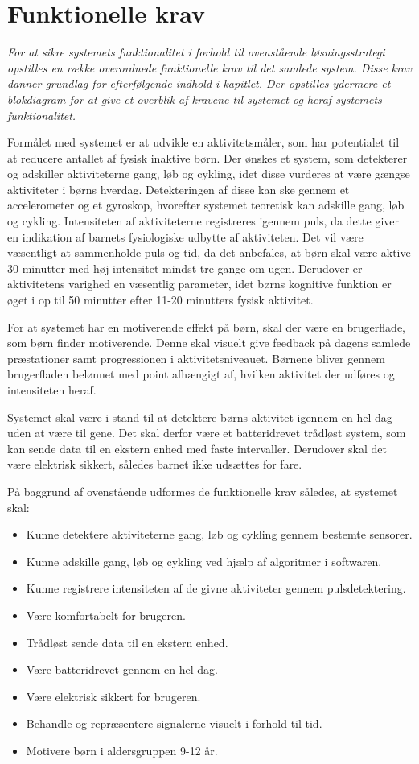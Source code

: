 \section{Funktionelle krav}\label{funktionellekrav}
\textit{For at sikre systemets funktionalitet i forhold til ovenstående løsningsstrategi opstilles en række overordnede funktionelle krav til det samlede system. Disse krav danner grundlag for efterfølgende indhold i kapitlet. Der opstilles ydermere et blokdiagram for at give et overblik af kravene til systemet og heraf systemets funktionalitet.}

Formålet med systemet er at udvikle en aktivitetsmåler, som har potentialet til at reducere antallet af fysisk inaktive børn. Der ønskes et system, som detekterer og adskiller aktiviteterne gang, løb og cykling, idet disse vurderes at være gængse aktiviteter i børns hverdag. Detekteringen af disse kan ske gennem et accelerometer og et gyroskop, hvorefter systemet teoretisk kan adskille gang, løb og cykling. Intensiteten af aktiviteterne registreres igennem puls, da dette giver en indikation af barnets fysiologiske udbytte af aktiviteten. Det vil være væsentligt at sammenholde puls og tid, da det anbefales, at børn skal være aktive 30 minutter med høj intensitet mindst tre gange om ugen. Derudover er aktivitetens varighed en væsentlig parameter, idet børns kognitive funktion er øget i op til 50 minutter efter 11-20 minutters fysisk aktivitet.

For at systemet har en motiverende effekt på børn, skal der være en brugerflade, som børn finder motiverende. Denne skal visuelt give feedback på dagens samlede præstationer samt progressionen i aktivitetsniveauet. Børnene bliver gennem brugerfladen belønnet med point afhængigt af, hvilken aktivitet der udføres og intensiteten heraf.  

Systemet skal være i stand til at detektere børns aktivitet igennem en hel dag uden at være til gene. Det skal derfor være et batteridrevet trådløst system, som kan sende data til en ekstern enhed med faste intervaller. Derudover skal det være elektrisk sikkert, således barnet ikke udsættes for fare. 

På baggrund af ovenstående udformes de funktionelle krav således, at systemet skal: 
\begin{itemize}
	\item Kunne detektere aktiviteterne gang, løb og cykling gennem bestemte sensorer.
	\item Kunne adskille gang, løb og cykling ved hjælp af algoritmer i softwaren.
	\item Kunne registrere intensiteten af de givne aktiviteter gennem pulsdetektering.
	\item Være komfortabelt for brugeren.
	\item Trådløst sende data til en ekstern enhed.
	\item Være batteridrevet gennem en hel dag.
	\item Være elektrisk sikkert for brugeren.
	\item Behandle og repræsentere signalerne visuelt i forhold til tid.
	\item Motivere børn i aldersgruppen 9-12 år. 
\end{itemize}

